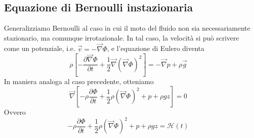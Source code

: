 \documentclass[a4paper,11pt]{article}
\begin{document}
\subsection{Equazione di Bernoulli instazionaria}
Generalizziamo Bernoulli al caso in cui il moto del fluido non sia necessariamente stazionario, ma comunque irrotazionale. In tal caso, la velocità si può scrivere come un potenziale, i.e. $\vec v=-\vec \nabla\Phi$, e l'equazione di Eulero diventa
\[\rho\left[-\frac{\partial\vec \nabla\Phi}{\partial t}+\frac{1}{2}\vec \nabla\left(\vec{\nabla}\Phi\right)^2\right]=-\vec{\nabla}p+\rho\vec{g}\]
In maniera analoga al caso precedente, otteniamo
\[\vec{\nabla}\left[-\rho\frac{\partial\Phi}{\partial t}+\frac{1}{2}\rho\left(\vec{\nabla}\Phi\right)^2+p+\rho gz\right]=0\]
Ovvero
\[-\rho\frac{\partial\Phi}{\partial t}+\frac{1}{2}\rho\left(\vec{\nabla}\Phi\right)^2+p+\rho gz=\mathcal{H}(t)\]
\end{document}
